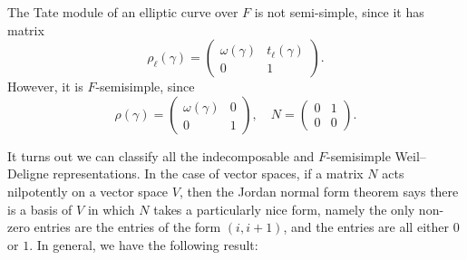 \documentclass[a4paper]{article}
\begin{document}
\begin{eg}
  The Tate module of an elliptic curve over $F$ is not semi-simple, since it has matrix
  \[
    \rho_\ell(\gamma) =
    \begin{pmatrix}
      \omega(\gamma) & t_\ell(\gamma)\\
      0 & 1
    \end{pmatrix}.
  \]
  However, it is $F$-semisimple, since
  \[
    \rho(\gamma) =
    \begin{pmatrix}
      \omega(\gamma) & 0\\
      0 & 1
    \end{pmatrix},\quad N =
    \begin{pmatrix}
      0 & 1\\
      0 & 0
    \end{pmatrix}.
  \]
\end{eg}

It turns out we can classify all the indecomposable and $F$-semisimple Weil--Deligne representations. In the case of vector spaces, if a matrix $N$ acts nilpotently on a vector space $V$, then the Jordan normal form theorem says there is a basis of $V$ in which $N$ takes a particularly nice form, namely the only non-zero entries are the entries of the form $(i, i + 1)$, and the entries are all either $0$ or $1$. In general, we have the following result:

%
\end{document}
